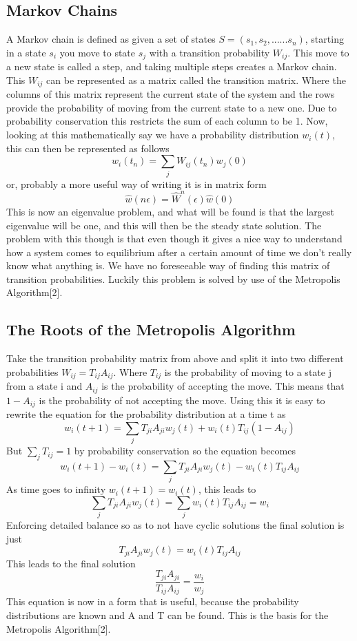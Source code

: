 \documentclass[12pt,righttag]{article}
\begin{document}
\subsection{Markov Chains}
A Markov chain is defined as given a set of states $S=(s_1,s_2,......s_n)$, starting in a state $s_i$ you move to state $s_j$ with a transition probability $W_{ij}$. This move to a new state is called a step, and taking multiple steps creates a Markov chain. This $W_{ij}$ can be represented as a matrix called the transition matrix. Where the columns of this matrix represent the current state of the system and the rows provide the probability of moving from the current state to a new one. Due to probability conservation this restricts the sum of each column to be 1. Now, looking at this mathematically say we have a probability distribution $w_i(t)$, this can then be represented as follows
\[w_i(t_n)=\sum_{j}W_{ij}(t_n)w_j(0)\]
or, probably a more useful way of writing it is in matrix form
\[\hat{w}(n\epsilon)=\hat{W}^n(\epsilon)\hat{w}(0)\]
This is now an eigenvalue problem, and what will be found is that the largest eigenvalue will be one, and this will then be the steady state solution. The problem with this though is that even though it gives a nice way to understand how a system comes to equilibrium after a certain amount of time we don't really know what anything is. We have no foreseeable way of finding this matrix of transition probabilities. Luckily this problem is solved by use of the Metropolis Algorithm[2].

\subsection{The Roots of the Metropolis Algorithm}
Take the transition probability matrix from above and split it into two different probabilities $W_{ij}=T_{ij}A_{ij}$. Where $T_{ij}$ is the probability of moving to a state j from a state i and $A_{ij}$ is the probability of accepting the move. This means that $1-A_{ij}$ is the probability of not accepting the move. Using this it is easy to rewrite the equation for the probability distribution at a time t as
\[w_i(t+1)=\sum_{j}T_{ji}A_{ji}w_j(t)+w_i(t)T_{ij}(1-A_{ij})\]
But $\sum_{j}T_{ij}=1$ by probability conservation so the equation becomes
\[w_i(t+1)-w_i(t)=\sum_{j}T_{ji}A_{ji}w_j(t)-w_i(t)T_{ij}A_{ij}\]
As time goes to infinity $w_i(t +1)=w_i(t)$, this leads to
\[\sum_{j}T_{ji}A_{ji}w_j(t)=\sum_{j}w_i(t)T_{ij}A_{ij}=w_i\]
Enforcing detailed balance so as to not have cyclic solutions the final solution is just
\[T_{ji}A_{ji}w_j(t)=w_i(t)T_{ij}A_{ij}\]
This leads to the final solution 
\[\frac{T_{ji}A_{ji}}{T_{ij}A_{ij}}=\frac{w_i}{w_j}\]
This equation is now in a form that is useful, because the probability distributions are known and A and T can be found. This is the basis for the Metropolis Algorithm[2].
\end{document}
